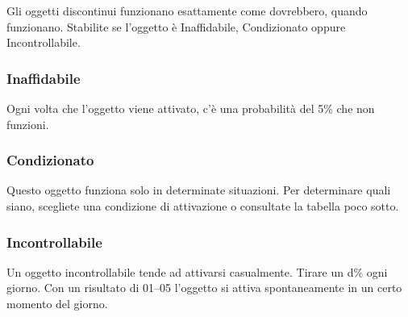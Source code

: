 \begin{multicols}{2}
Gli oggetti discontinui funzionano esattamente come dovrebbero, quando funzionano. Stabilite se l'oggetto è Inaffidabile, Condizionato oppure Incontrollabile.

\medskip
\subsubsection{Inaffidabile}

Ogni volta che l'oggetto viene attivato, c'è una probabilità del 5\% che non funzioni.

\subsubsection{Condizionato}

Questo oggetto funziona solo in determinate situazioni. Per determinare quali siano, scegliete una condizione di attivazione o consultate la tabella poco sotto.

\subsubsection{Incontrollabile}

Un oggetto incontrollabile tende ad attivarsi casualmente. Tirare un d\% ogni giorno. Con un risultato di 01--05 l'oggetto si attiva spontaneamente in un certo momento del giorno.

\medskip


\end{multicols}
